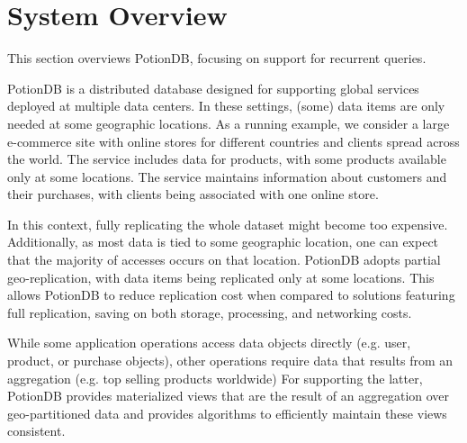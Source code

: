 \documentclass[sigplan,twocolumn,review,anonymous]{acmart}
\newcommand{\outline}[1]{}
\begin{document}
%

\section{System Overview}
\label{sec:overview}

This section overviews PotionDB, focusing on support for 
recurrent queries.

PotionDB is a distributed database designed for supporting global services deployed at multiple data centers. 
In these settings, (some) data items are only needed at some geographic locations. 
As a running example, we consider a large e-commerce site with online stores for different countries 
and clients spread across the world. 
The service includes data for products, with some products available 
only at some locations. The service maintains information about customers and their purchases, 
with clients being associated with one online store.

In this context, fully replicating the whole dataset might become too expensive.
Additionally, as most data is tied to some geographic location, one can expect that the majority of accesses
occurs on that location. 
PotionDB adopts partial geo-replication, with data items being replicated only at some locations.
This allows PotionDB to reduce replication cost when
compared to solutions featuring full replication, saving on both storage, processing, and networking costs.

While some application operations access data objects directly (e.g. user, product, or purchase objects),
other operations require data that results from an aggregation (e.g.  top
selling products worldwide)
For supporting the latter, %
PotionDB provides materialized views that are the result of an aggregation 
over geo-partitioned data and provides algorithms to efficiently maintain these views consistent.
\end{document}
